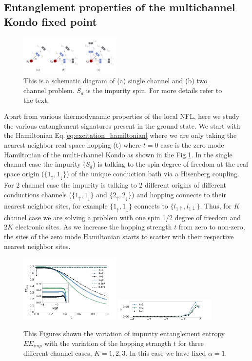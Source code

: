 \documentclass[reprint,prb,superscriptaddress]{revtex4-2}
\begin{document}
\subsection{Entanglement properties of the multichannel Kondo fixed point}
\begin{figure}[!htpb]
\includegraphics[width=0.45\textwidth]{plt/hopping_fock_states}
\caption{This is a schematic diagram of (a) single channel and (b) two channel problem. $S_d$ is the impurity spin. For more details refer to the text.}
\label{fig:schematic_hopping}
\end{figure}


\noindent Apart from various thermodynamic properties of the local NFL, here we study the various entanglement signatures present in the ground state. We start with the Hamiltonian Eq.\eqref{eq:excitation_hamiltonian} where we are only taking the nearest neighbor real space hopping (t) where $t=0$ case is the zero mode Hamiltonian of the multi-channel Kondo as shown in the Fig.\ref{fig:schematic_hopping}. In the single channel case the impurity ($S_d$) is talking to the spin degree of freedom at the real space origin ($\{1_{\uparrow},1_{\downarrow}\}$) of the unique conduction bath via a Hisenberg coupling. For $2$ channel case the impurity is talking to $2$ different origins of different conductions channels ($\{1_{\uparrow},1_{\downarrow}\}$ and $\{2_{\uparrow},2_{\downarrow}\}$) and hopping connects to their nearest neighbor sites, for example $\{1_{\uparrow},1_{\downarrow}\}$ connects to $\{l_{1\uparrow},l_{1\downarrow}\}$. Thus, for $K$ channel case we are solving a problem with one spin 1/2 degree of freedom and $2K$ electronic sites. As we increase the hopping strength $t$ from zero to non-zero, the sites of the zero mode Hamiltonian starts to scatter with their respective nearest neighbor sites.


\begin{figure}[!htpb]
\centering
\includegraphics[width=0.45\textwidth]{plt/A_I1_ch123_['d']}
\includegraphics[width=0.45\textwidth]{plt/errorbar_A_I1_ch123_['d']}
\caption{This Figures shown the variation of impurity entanglement entropy $EE_{imp}$ with the variation of the hopping strangth $t$ for three different channel cases, $K=1,2,3$. In this case we have fixed $\alpha=1$.}
\label{fig:EE_imp_vs_t_K}
\end{figure}
\end{document}

